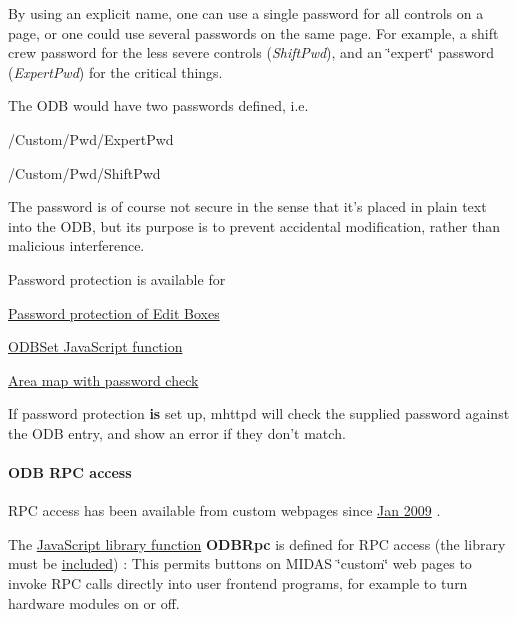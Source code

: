 By using an explicit name, one can use a single password for all controls on a page, or one could use several passwords on the same page. For example, a shift crew password for the less severe controls ({\itshape ShiftPwd\/}), and an \char`\"{}expert\char`\"{} password ({\itshape ExpertPwd\/}) for the critical things.

The ODB would have two passwords defined, i.e.\par
  /Custom/Pwd/ExpertPwd\par
 /Custom/Pwd/ShiftPwd\par


The password is of course not secure in the sense that it's placed in plain text into the ODB, but its purpose is to prevent accidental modification, rather than malicious interference.

\par
 Password protection is available for
\begin{DoxyItemize}
\item \hyperlink{RC_mhttpd_Image_access_RC_mhttpd_custom_pw}{Password protection of Edit Boxes}
\item \hyperlink{RC_mhttpd_custom_ODB_access_RC_mhttpd_custom_odbset}{ODBSet JavaScript function}
\item \hyperlink{RC_mhttpd_Image_access_RC_mhttpd_custom_imagemap_pw}{Area map with password check}
\end{DoxyItemize}

If password protection {\bfseries is} set up, mhttpd will check the supplied password against the ODB entry, and show an error if they don't match.

\label{index_end}
\hypertarget{index_end}{}


 \paragraph{ODB RPC access}\label{RC_mhttpd_custom_RPC_access}


\par


 RPC access has been available from custom webpages since \hyperlink{NDF_ndf_jan_2009}{Jan 2009} . 

The \hyperlink{RC_mhttpd_custom_js_lib}{JavaScript library function} {\bfseries ODBRpc} is defined for RPC access (the library must be \hyperlink{RC_mhttpd_custom_js_lib_RC_mhttpd_include_js_library}{included}) : This permits buttons on MIDAS \char`\"{}custom\char`\"{} web pages to invoke RPC calls directly into user frontend programs, for example to turn hardware modules on or off.

